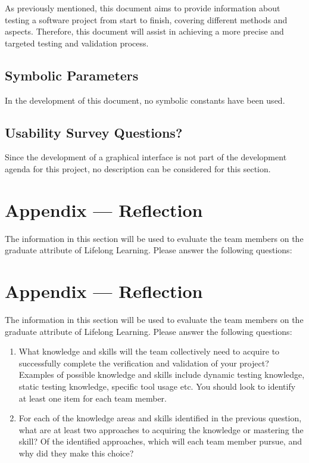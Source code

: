 \documentclass[12pt, titlepage]{article}
\begin{document}
As previously mentioned, this document aims to provide information about testing a software project from start to finish, covering different methods and aspects. Therefore, this document will assist in achieving a more precise and targeted testing and validation process.

\subsection{Symbolic Parameters}

In the development of this document, no symbolic constants have been used.
\subsection{Usability Survey Questions?}

Since the development of a graphical interface is not part of the development agenda for this project, no description can be considered for this section.

\newpage{}
\section*{Appendix --- Reflection}

The information in this section will be used to evaluate the team members on the
graduate attribute of Lifelong Learning.  Please answer the following questions:

\newpage{}
\section*{Appendix --- Reflection}


The information in this section will be used to evaluate the team members on the
graduate attribute of Lifelong Learning.  Please answer the following questions:

\begin{enumerate}
  \item What knowledge and skills will the team collectively need to acquire to
  successfully complete the verification and validation of your project?
  Examples of possible knowledge and skills include dynamic testing knowledge,
  static testing knowledge, specific tool usage etc.  You should look to
  identify at least one item for each team member.
  \item For each of the knowledge areas and skills identified in the previous
  question, what are at least two approaches to acquiring the knowledge or
  mastering the skill?  Of the identified approaches, which will each team
  member pursue, and why did they make this choice?
\end{enumerate}
\end{document}
